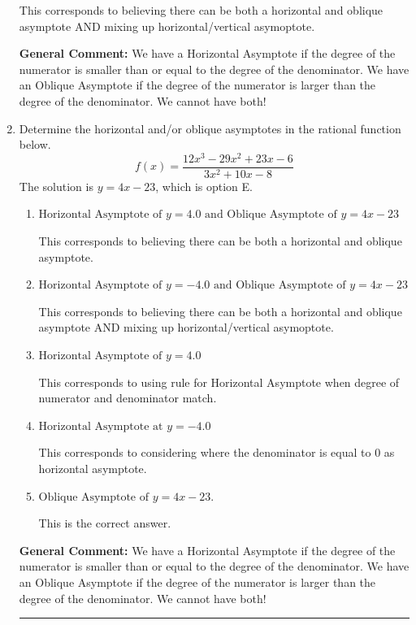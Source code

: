 \documentclass{extbook}[14pt]
\newcommand{\litem}[1]{\item #1

\rule{\textwidth}{0.4pt}}
\begin{document}
\begin{enumerate}
{\begin{enumerate}[label=\Alph*.]
This corresponds to believing there can be both a horizontal and oblique asymptote AND mixing up horizontal/vertical asymoptote.
\end{enumerate}

\textbf{General Comment:} We have a Horizontal Asymptote if the degree of the numerator is smaller than or equal to the degree of the denominator. We have an Oblique Asymptote if the degree of the numerator is larger than the degree of the denominator. We cannot have both!
}
\litem{
Determine the horizontal and/or oblique asymptotes in the rational function below.
\[ f(x) = \frac{12x^{3} -29 x^{2} +23 x -6}{3x^{2} +10 x -8} \]The solution is \( y = 4x -23 \), which is option E.\begin{enumerate}[label=\Alph*.]
\item \( \text{Horizontal Asymptote of } y = 4.0 \text{ and Oblique Asymptote of } y = 4x -23 \)

This corresponds to believing there can be both a horizontal and oblique asymptote.
\item \( \text{Horizontal Asymptote of } y = -4.0 \text{ and Oblique Asymptote of } y = 4x -23 \)

This corresponds to believing there can be both a horizontal and oblique asymptote AND mixing up horizontal/vertical asymoptote.
\item \( \text{Horizontal Asymptote of } y = 4.0  \)

This corresponds to using rule for Horizontal Asymptote when degree of numerator and denominator match.
\item \( \text{Horizontal Asymptote at } y = -4.0 \)

This corresponds to considering where the denominator is equal to 0 as horizontal asymptote.
\item \( \text{Oblique Asymptote of } y = 4x -23. \)

This is the correct answer.
\end{enumerate}

\textbf{General Comment:} We have a Horizontal Asymptote if the degree of the numerator is smaller than or equal to the degree of the denominator. We have an Oblique Asymptote if the degree of the numerator is larger than the degree of the denominator. We cannot have both!
}
\end{enumerate}
\end{document}
